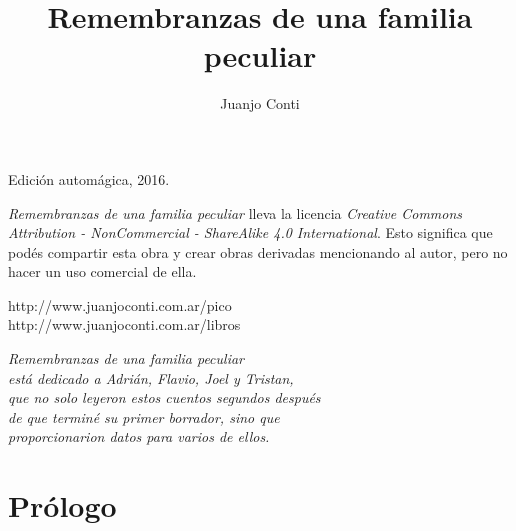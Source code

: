 \documentclass[12pt,twoside,openright,a5paper]{book}
\title{Remembranzas de una familia peculiar}
\author{Juanjo Conti}
\date{}
\begin{document}
\pagestyle{plain}

\maketitle


\thispagestyle{empty}
\noindent
Edición automágica, 2016.\\

\vspace{0.5cm}

\noindent
\emph{Remembranzas de una familia peculiar} lleva la licencia
\emph{Creative Commons Attribution - NonCommercial - ShareAlike 4.0 International}.
Esto significa que podés compartir esta obra y crear obras derivadas
mencionando al autor, pero no ha\-cer un uso comercial de ella.

\vfill

\noindent
http://www.juanjoconti.com.ar/pico\\

\noindent
http://www.juanjoconti.com.ar/libros

\cleardoublepage

\noindent
\begin{flushright}
\emph{
\emph{Remembranzas de una familia peculiar}\\
está dedicado a Adrián, Flavio, Joel y Tristan,\\
que no solo leyeron estos cuentos segundos después\\
de que terminé su primer borrador, sino que\\
proporcionarion datos para varios de ellos.
}
\end{flushright}

\cleardoublepage

\renewcommand*\contentsname{Índice}

\tableofcontents

\chapter*{Prólogo}


























\end{document}
